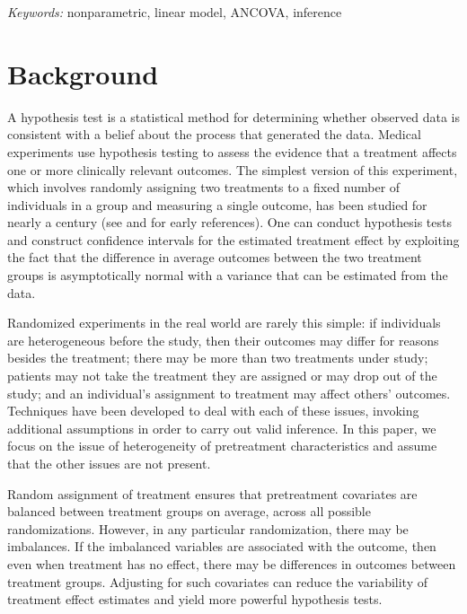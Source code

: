 \documentclass[12pt]{article}
\begin{document}
\noindent%
{\it Keywords:}  nonparametric, linear model, ANCOVA, inference
\vfill

\newpage
\section{Background}
A hypothesis test is a statistical method for determining whether observed data is consistent with a belief about the process that generated the data.
Medical experiments use hypothesis testing to assess the evidence that a treatment affects one or more clinically relevant outcomes.
The simplest version of this experiment, which involves randomly assigning two treatments to a fixed number of individuals in a group and measuring a single outcome, has been studied for nearly a century (see \cite{fisher_design_1935} and \cite{neyman_application_1923} for early references).
One can conduct hypothesis tests and construct confidence intervals for the estimated treatment effect
by exploiting the fact that the difference in average outcomes between the two treatment groups is asymptotically normal with a variance that can be estimated from the data.

Randomized experiments in the real world are rarely this simple:
if individuals are heterogeneous before the study, then their outcomes may differ for reasons besides the treatment;
there may be more than two treatments under study;
patients may not take the treatment they are assigned or may drop out of the study;
and an individual's assignment to treatment may affect others' outcomes.
Techniques have been developed to deal with each of these issues, invoking additional assumptions in order to carry out valid inference.
In this paper, we focus on the issue of heterogeneity of pretreatment characteristics and assume that the other issues are not present.

Random assignment of treatment ensures that pretreatment covariates are balanced between treatment groups on average, across all possible randomizations.
However, in any particular randomization, there may be imbalances.
If the imbalanced variables are associated with the outcome, then even when treatment has no effect, there may be differences in outcomes between treatment groups.
Adjusting for such covariates can reduce the variability of treatment effect estimates and yield more powerful hypothesis tests.
\end{document}
